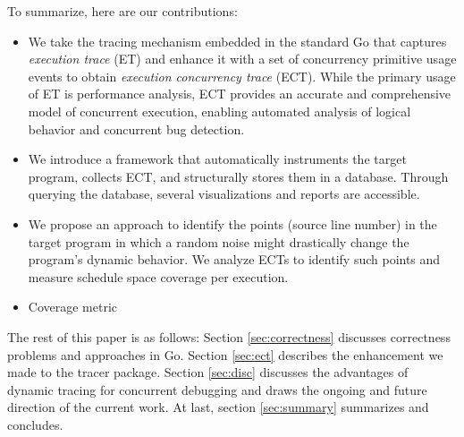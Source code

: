 To summarize, here are our contributions:
\begin{itemize}
    \item We take the tracing mechanism embedded in the standard Go that captures \textit{execution trace} (ET) and enhance it with a set of concurrency primitive usage events to obtain \textit{execution concurrency trace} (ECT). While the primary usage of ET is performance analysis, ECT provides an accurate and comprehensive model of concurrent execution, enabling automated analysis of logical behavior and concurrent bug detection.
    \item We introduce a framework that automatically instruments the target program, collects ECT, and structurally stores them in a database. Through querying the database, several visualizations and reports are accessible.
    \item We propose an approach to identify the points (\ie source line number) in the target program in which a random noise might drastically change the program's dynamic behavior. We analyze ECTs to identify such points and measure schedule space coverage per execution.
    \item Coverage metric
\end{itemize}
The rest of this paper is as follows: Section \ref{sec:correctness} discusses correctness problems and approaches in Go. Section \ref{sec:ect} describes the enhancement we made to the tracer package. Section \ref{sec:disc} discusses the advantages of dynamic tracing for concurrent debugging and draws the ongoing and future direction of the current work. At last, section \ref{sec:summary} summarizes and concludes.
